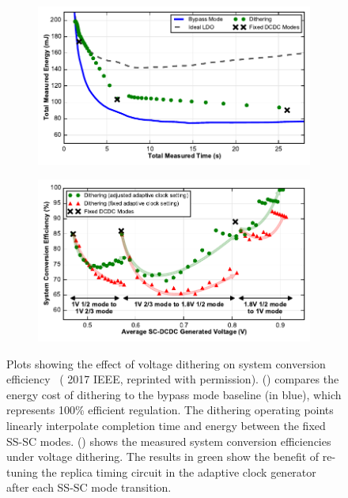 \documentclass[graybox]{svmult}
\begin{document}
\begin{figure}
  \centering
  \begin{subfigure}[t]{\textwidth}
  \centering
  \includegraphics[width=\textwidth]{6-raven4-voltage-dithering-a}
  \caption{}
  \label{fig:6-raven4-voltage-dithering-a}
  \end{subfigure}
  \par\bigskip
  \begin{subfigure}[t]{\textwidth}
  \centering
  \includegraphics[width=\textwidth]{6-raven4-voltage-dithering-b}
  \caption{}
  \label{fig:6-raven4-voltage-dithering-b}
  \end{subfigure}
  \caption{Plots showing the effect of voltage dithering on system conversion efficiency~\cite{Keller2017} ({\textcopyright} 2017 IEEE, reprinted with permission).  () compares the energy cost of dithering to the bypass mode baseline (in blue), which represents 100\% efficient regulation.  The dithering operating points linearly interpolate completion time and energy between the fixed SS-SC modes.  () shows the measured system conversion efficiencies under voltage dithering.  The results in green show the benefit of re-tuning the replica timing circuit in the adaptive clock generator after each SS-SC mode transition.}
  \label{fig:6-raven4-voltage-dithering}
\end{figure}
\end{document}
